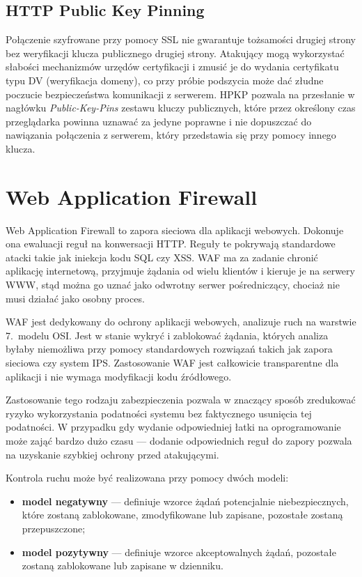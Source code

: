 \documentclass[11pt,a4paper,polish,thesis]{dcsbook}
\begin{document}
\subsection{HTTP Public Key Pinning}
Połączenie szyfrowane przy pomocy SSL nie gwarantuje tożsamości drugiej strony bez weryfikacji klucza publicznego drugiej strony. Atakujący mogą wykorzystać słabości mechanizmów urzędów certyfikacji i zmusić je do wydania certyfikatu typu DV (weryfikacja domeny), co przy próbie podszycia może dać złudne poczucie bezpieczeństwa komunikacji z serwerem. HPKP pozwala na przesłanie w nagłówku \textit{Public-Key-Pins} zestawu kluczy publicznych, które przez określony czas przeglądarka powinna uznawać za jedyne poprawne i nie dopuszczać do nawiązania połączenia z serwerem, który przedstawia się przy pomocy innego klucza.

\section{Web Application Firewall}
\label{waf}
Web Application Firewall to zapora sieciowa dla aplikacji webowych. Dokonuje ona ewaluacji reguł na konwersacji HTTP. Reguły te pokrywają standardowe atacki takie jak iniekcja kodu SQL czy XSS. WAF ma za zadanie chronić aplikację internetową, przyjmuje żądania od wielu klientów i kieruje je na serwery WWW, stąd można go uznać jako odwrotny serwer pośredniczący, chociaż nie musi działać jako osobny proces.

WAF jest dedykowany do ochrony aplikacji webowych, analizuje ruch na warstwie 7.~modelu OSI. Jest w stanie wykryć i zablokować żądania, których analiza byłaby niemożliwa przy pomocy standardowych rozwiązań takich jak zapora sieciowa czy system IPS. Zastosowanie WAF jest całkowicie transparentne dla aplikacji i nie wymaga modyfikacji kodu źródłowego.

Zastosowanie tego rodzaju zabezpieczenia pozwala w znaczący sposób zredukować ryzyko wykorzystania podatności systemu bez faktycznego usunięcia tej podatności. W przypadku gdy wydanie odpowiedniej łatki na oprogramowanie może zająć bardzo dużo czasu --- dodanie odpowiednich reguł do zapory pozwala na uzyskanie szybkiej ochrony przed atakującymi.

Kontrola ruchu może być realizowana przy pomocy dwóch modeli:
\begin{itemize}
\item \textbf{model negatywny} --- definiuje wzorce żądań potencjalnie niebezpiecznych, które zostaną zablokowane, zmodyfikowane lub zapisane, pozostałe zostaną przepuszczone;
\item \textbf{model pozytywny} --- definiuje wzorce akceptowalnych żądań, pozostałe zostaną zablokowane lub zapisane w dzienniku.
\end{itemize}
\end{document}
